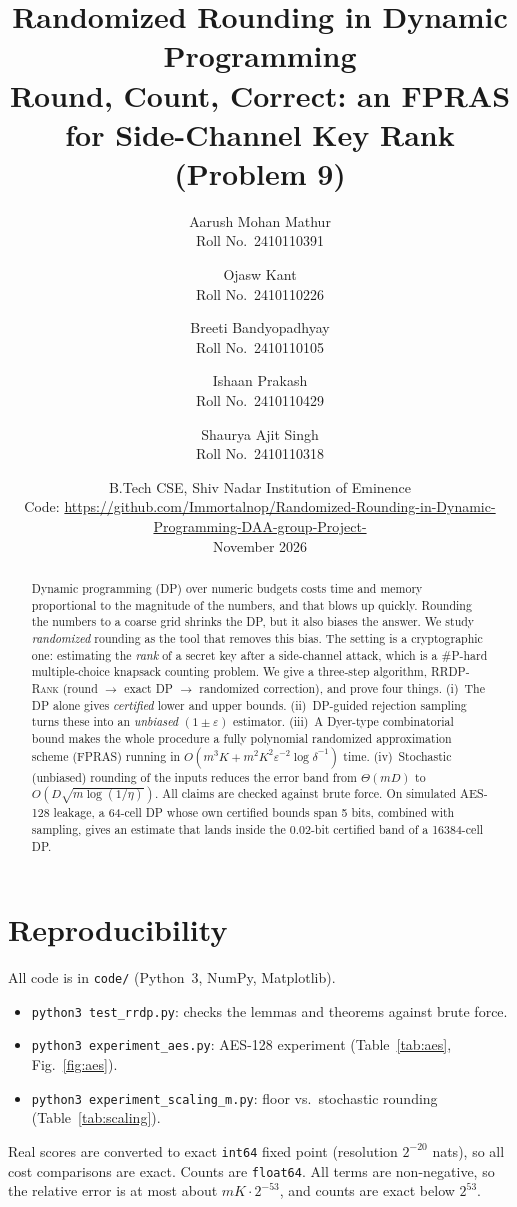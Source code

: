 \documentclass[11pt,a4paper]{article}
\title{\textbf{Randomized Rounding in Dynamic Programming}\\[2pt]
\large Round, Count, Correct: an FPRAS for Side-Channel Key Rank\\
\normalsize (Problem 9)}
\author{Aarush Mohan Mathur \\ Roll No.\ 2410110391 \and
Ojasw Kant \\ Roll No.\ 2410110226 \and
Breeti Bandyopadhyay \\ Roll No.\ 2410110105 \and
Ishaan Prakash \\ Roll No.\ 2410110429 \and
Shaurya Ajit Singh \\ Roll No.\ 2410110318}
\date{B.Tech CSE, Shiv Nadar Institution of Eminence\\[4pt]
{\footnotesize Code: \url{https://github.com/Immortalnop/Randomized-Rounding-in-Dynamic-Programming-DAA-group-Project-}}\\[10pt]
November 2026}
\theoremstyle{definition}
\theoremstyle{remark}
\newcommand{\eps}{\varepsilon}
\begin{document}
\maketitle

\begin{abstract}
Dynamic programming (DP) over numeric budgets costs time and memory proportional to the
magnitude of the numbers, and that blows up quickly. Rounding the numbers to a coarse grid shrinks the DP, but it also biases the answer.
We study \emph{randomized} rounding as the tool that removes this bias. The setting is a
cryptographic one: estimating the \emph{rank} of a secret key after a side-channel attack,
which is a \#P-hard multiple-choice knapsack counting problem. We give a three-step
algorithm, \textsc{RRDP-Rank} (round $\to$ exact DP $\to$ randomized correction), and prove four things.
(i)~The DP alone gives \emph{certified} lower and upper bounds.
(ii)~DP-guided rejection sampling turns these into an \emph{unbiased} $(1\pm\eps)$ estimator.
(iii)~A Dyer-type combinatorial bound makes the whole procedure a fully polynomial randomized
approximation scheme (FPRAS) running in $O(m^3K + m^2K^2\eps^{-2}\log\delta^{-1})$ time.
(iv)~Stochastic (unbiased) rounding of the inputs reduces the error band from $\Theta(mD)$ to $O(D\sqrt{m\log(1/\eta)})$.
All claims are checked against brute force. On simulated AES-128 leakage, a 64-cell DP whose own certified
bounds span 5 bits, combined with sampling, gives an estimate that lands inside the 0.02-bit certified band of a 16384-cell DP.
\end{abstract}

\tableofcontents
\newpage








\appendix
\section{Reproducibility}
All code is in \texttt{code/} (Python~3, NumPy, Matplotlib).
\begin{itemize}[nosep]
\item \texttt{python3 test\_rrdp.py}: checks the lemmas and theorems against brute force.
\item \texttt{python3 experiment\_aes.py}: AES-128 experiment (Table~\ref{tab:aes}, Fig.~\ref{fig:aes}).
\item \texttt{python3 experiment\_scaling\_m.py}: floor vs.\ stochastic rounding (Table~\ref{tab:scaling}).
\end{itemize}
Real scores are converted to exact \texttt{int64} fixed point (resolution $2^{-20}$ nats), so
all cost comparisons are exact. Counts are \texttt{float64}. All terms are non-negative, so the
relative error is at most about $mK\cdot2^{-53}$, and counts are exact below $2^{53}$.



\end{document}
